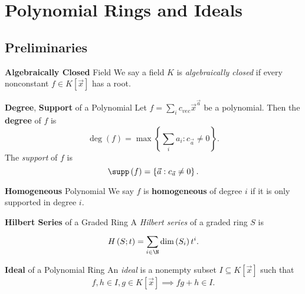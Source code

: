 \documentclass[11pt]{article}
\begin{document}
    
    \section{Polynomial Rings and Ideals}

    \subsection{Preliminaries}

    \begin{definition}{\textbf{Algebraically Closed} Field}
        We say a field $K$ is \emph{algebraically closed} if every nonconstant $f\in K\left[ \vec{x} \right]$ has a root.
    \end{definition}

    \begin{definition}{\textbf{Degree}, \textbf{Support} of a Polynomial}
        Let $f = \sum^{}_{i}c_{vec}\vec{x}^{\vec{a}}$ be a polynomial. Then the \textbf{degree} of $f$ is
        \begin{equation*}
            \deg\left( f \right) = \max\left\lbrace \sum^{}_{i}a_i: c_{\vec{a}}\neq 0 \right\rbrace.
        \end{equation*}
        The \emph{support} of $f$ is
        \begin{equation*}
            \supp\left( f \right) = \left\lbrace \vec{a}: c_{\vec{a}}\neq 0 \right\rbrace.
        \end{equation*}
    \end{definition}

    \begin{definition}{\textbf{Homogeneous} Polynomial}
        We say $f$ is \textbf{homogeneous} of degree $i$ if it is only supported in degree $i$.
    \end{definition}

    \begin{definition}{\textbf{Hilbert Series} of a Graded Ring}
        A \emph{Hilbert series} of a graded ring $S$ is
        \begin{equation*}
            H\left( S;t \right) = \sum^{}_{i\in\N} \dim\left( S_i \right) t^i.
        \end{equation*}
    \end{definition}

    \begin{definition}{\textbf{Ideal} of a Polynomial Ring}
        An \emph{ideal} is a nonempty subset $I\subseteq K\left[ \vec{x} \right]$ such that
        \begin{equation*}
            f,h\in I, g\in K\left[ \vec{x} \right] \implies fg+h \in I.
        \end{equation*}
    \end{definition}
    
\end{document}
